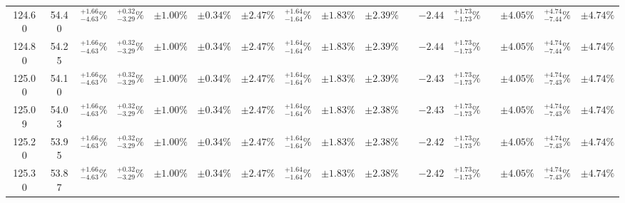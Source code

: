 \begin{landscape}
\begin{table}[ht!]
{\begin{tabular}{| cc | cccc | ccc | c |@{}c@{\;}| cc |@{}c@{\;}| ccc |}
124.60 & 54.40 & \({}^{ +1.66}_{ -4.63}\%\) & {\color{black!55}\({}^{ +0.32}_{ -3.29}\%\)} & {\color{black!55}\(\pm{  1.00}\%\)} & {\color{black!55}\(\pm{  0.34}\%\)} & \(\pm 2.47\%\) & {\color{black!55}\({}^{ +1.64}_{ -1.64}\%\)} & {\color{black!55}\(\pm 1.83\%\)} & \(\pm{  2.39}\%\) &  & \(-2.44\) & \({}^{ +1.73}_{ -1.73}\%\) &  & \(\pm 4.05\%\) & \({}^{ +4.74}_{ -7.44}\%\) & \(\pm 4.74\%\)\\
124.80 & 54.25 & \({}^{ +1.66}_{ -4.63}\%\) & {\color{black!55}\({}^{ +0.32}_{ -3.29}\%\)} & {\color{black!55}\(\pm{  1.00}\%\)} & {\color{black!55}\(\pm{  0.34}\%\)} & \(\pm 2.47\%\) & {\color{black!55}\({}^{ +1.64}_{ -1.64}\%\)} & {\color{black!55}\(\pm 1.83\%\)} & \(\pm{  2.39}\%\) &  & \(-2.44\) & \({}^{ +1.73}_{ -1.73}\%\) &  & \(\pm 4.05\%\) & \({}^{ +4.74}_{ -7.44}\%\) & \(\pm 4.74\%\)\\
125.00 & 54.10 & \({}^{ +1.66}_{ -4.63}\%\) & {\color{black!55}\({}^{ +0.32}_{ -3.29}\%\)} & {\color{black!55}\(\pm{  1.00}\%\)} & {\color{black!55}\(\pm{  0.34}\%\)} & \(\pm 2.47\%\) & {\color{black!55}\({}^{ +1.64}_{ -1.64}\%\)} & {\color{black!55}\(\pm 1.83\%\)} & \(\pm{  2.39}\%\) &  & \(-2.43\) & \({}^{ +1.73}_{ -1.73}\%\) &  & \(\pm 4.05\%\) & \({}^{ +4.74}_{ -7.43}\%\) & \(\pm 4.74\%\)\\
125.09 & 54.03 & \({}^{ +1.66}_{ -4.63}\%\) & {\color{black!55}\({}^{ +0.32}_{ -3.29}\%\)} & {\color{black!55}\(\pm{  1.00}\%\)} & {\color{black!55}\(\pm{  0.34}\%\)} & \(\pm 2.47\%\) & {\color{black!55}\({}^{ +1.64}_{ -1.64}\%\)} & {\color{black!55}\(\pm 1.83\%\)} & \(\pm{  2.38}\%\) &  & \(-2.43\) & \({}^{ +1.73}_{ -1.73}\%\) &  & \(\pm 4.05\%\) & \({}^{ +4.74}_{ -7.43}\%\) & \(\pm 4.74\%\)\\
125.20 & 53.95 & \({}^{ +1.66}_{ -4.63}\%\) & {\color{black!55}\({}^{ +0.32}_{ -3.29}\%\)} & {\color{black!55}\(\pm{  1.00}\%\)} & {\color{black!55}\(\pm{  0.34}\%\)} & \(\pm 2.47\%\) & {\color{black!55}\({}^{ +1.64}_{ -1.64}\%\)} & {\color{black!55}\(\pm 1.83\%\)} & \(\pm{  2.38}\%\) &  & \(-2.42\) & \({}^{ +1.73}_{ -1.73}\%\) &  & \(\pm 4.05\%\) & \({}^{ +4.74}_{ -7.43}\%\) & \(\pm 4.74\%\)\\
125.30 & 53.87 & \({}^{ +1.66}_{ -4.63}\%\) & {\color{black!55}\({}^{ +0.32}_{ -3.29}\%\)} & {\color{black!55}\(\pm{  1.00}\%\)} & {\color{black!55}\(\pm{  0.34}\%\)} & \(\pm 2.47\%\) & {\color{black!55}\({}^{ +1.64}_{ -1.64}\%\)} & {\color{black!55}\(\pm 1.83\%\)} & \(\pm{  2.38}\%\) &  & \(-2.42\) & \({}^{ +1.73}_{ -1.73}\%\) &  & \(\pm 4.05\%\) & \({}^{ +4.74}_{ -7.43}\%\) & \(\pm 4.74\%\)\\

\end{tabular}}
\end{table}
\end{landscape}
